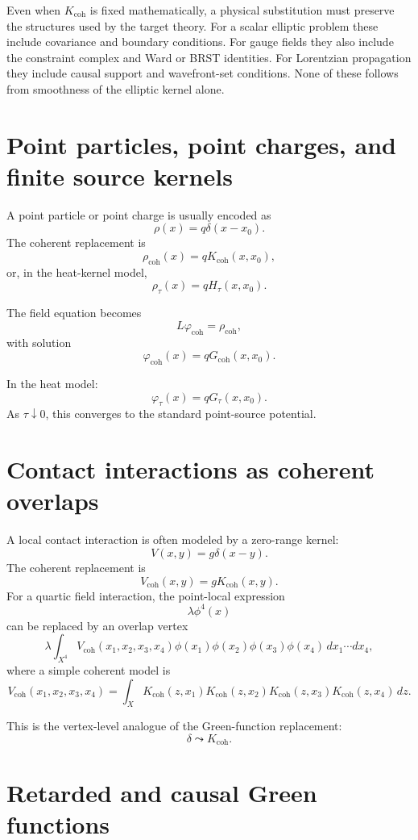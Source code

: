 \documentclass[11pt]{article}
\begin{document}
\begin{remark}
Even when \(K_{\mathrm{coh}}\) is fixed mathematically, a physical
substitution must preserve the structures used by the target theory.  For a
scalar elliptic problem these include covariance and boundary conditions.
For gauge fields they also include the constraint complex and Ward or BRST
identities.  For Lorentzian propagation they include causal support and
wavefront-set conditions.  None of these follows from smoothness of the
elliptic kernel alone.
\end{remark}

\section{Point particles, point charges, and finite source kernels}

A point particle or point charge is usually encoded as
\[
\rho(x)=q\delta(x-x_0).
\]
The coherent replacement is
\[
\rho_{\mathrm{coh}}(x)=qK_{\mathrm{coh}}(x,x_0),
\]
or, in the heat-kernel model,
\[
\rho_\tau(x)=qH_\tau(x,x_0).
\]

The field equation becomes
\[
L\varphi_{\mathrm{coh}}=\rho_{\mathrm{coh}},
\]
with solution
\[
\varphi_{\mathrm{coh}}(x)=qG_{\mathrm{coh}}(x,x_0).
\]

In the heat model:
\[
\varphi_\tau(x)=qG_\tau(x,x_0).
\]
As \(\tau\downarrow0\), this converges to the standard point-source potential.

\section{Contact interactions as coherent overlaps}

A local contact interaction is often modeled by a zero-range kernel:
\[
V(x,y)=g\delta(x-y).
\]
The coherent replacement is
\[
V_{\mathrm{coh}}(x,y)=gK_{\mathrm{coh}}(x,y).
\]
For a quartic field interaction, the point-local expression
\[
\lambda\phi^4(x)
\]
can be replaced by an overlap vertex
\[
\lambda\int_{X^4}V_{\mathrm{coh}}(x_1,x_2,x_3,x_4)
\phi(x_1)\phi(x_2)\phi(x_3)\phi(x_4)\,dx_1\cdots dx_4,
\]
where a simple coherent model is
\[
V_{\mathrm{coh}}(x_1,x_2,x_3,x_4)
=
\int_X K_{\mathrm{coh}}(z,x_1)K_{\mathrm{coh}}(z,x_2)
K_{\mathrm{coh}}(z,x_3)K_{\mathrm{coh}}(z,x_4)\,dz.
\]

This is the vertex-level analogue of the Green-function replacement:
\[
\delta \leadsto K_{\mathrm{coh}}.
\]

\section{Retarded and causal Green functions}
\end{document}
